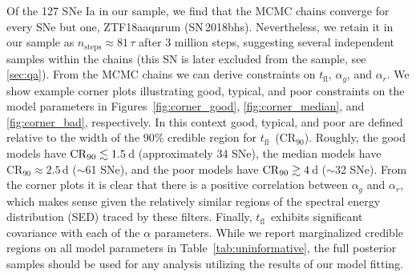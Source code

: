\documentclass[twocolumn]{aastex63}
\newcommand{\tfl}{$t_\mathrm{fl}$}
\begin{document}
Of the 127 SNe Ia in our sample, we find that the MCMC chains converge for
every SNe but one, ZTF18aaqnrum (SN\,2018bhs). Nevertheless, we retain it in
our sample as $n_\mathrm{steps} \approx 81 \,\tau$ after 3 million steps,
suggesting several independent samples within the chains (this SN is later
excluded from the sample, see \ref{sec:qa}). From the MCMC chains we can
derive constraints on \tfl, $\alpha_g$, and $\alpha_r$. We show example corner
plots illustrating good, typical, and poor constraints on the model parameters
in Figures~\ref{fig:corner_good}, \ref{fig:corner_median}, and
\ref{fig:corner_bad}, respectively. In this context good, typical, and poor
are defined relative to the width of the 90\% credible region for \tfl\
($\mathrm{CR}_{90}$). Roughly, the good models have $\mathrm{CR}_{90} \lesssim
1.5$\,d (approximately 34 SNe), the median models have $\mathrm{CR}_{90}
\approx 2.5$\,d ($\sim$61 SNe), and the poor models have $\mathrm{CR}_{90} \gtrsim
4$\,d ($\sim$32 SNe). From the corner plots it is clear that there is a
positive correlation between $\alpha_g$ and $\alpha_r$, which makes sense
given the relatively similar regions of the spectral energy distribution (SED)
traced by these filters. Finally, \tfl\ exhibits significant covariance with
each of the $\alpha$ parameters. While we report marginalized credible regions
on all model parameters in Table~\ref{tab:uninformative}, the full posterior
samples should be used for any analysis utilizing the results of our model
fitting.
\end{document}
